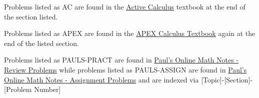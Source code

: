 \documentclass[12pt]{article}
\title{}
\author{[COURSE TITLE HERE]}
\date{}
\begin{document}
\maketitle

Problems listed as AC are found in the \href{https://activecalculus.org/single1e/frontmatter.html}{Active Calculus} 
textbook at the end of the section listed.

Problems listed as APEX are found in the \href{https://opentext.uleth.ca/apex-calculus/apex-calculus.html}{APEX Calculus Textbook}
again at the end of the listed section.

Problems listed as PAULS-PRACT are found in \href{https://tutorial.math.lamar.edu/Problems/CalcI/CalcI.aspx}{Paul's Online Math Notes - Review Problems}
while problems listed as PAULS-ASSIGN are found in \href{https://tutorial.math.lamar.edu/ProblemsNS/CalcI/CalcI.aspx}{Paul's Online Math Notes - Assignment Problems}
and are indexed via [Topic]-[Section]-[Problem Number]



\end{document}
